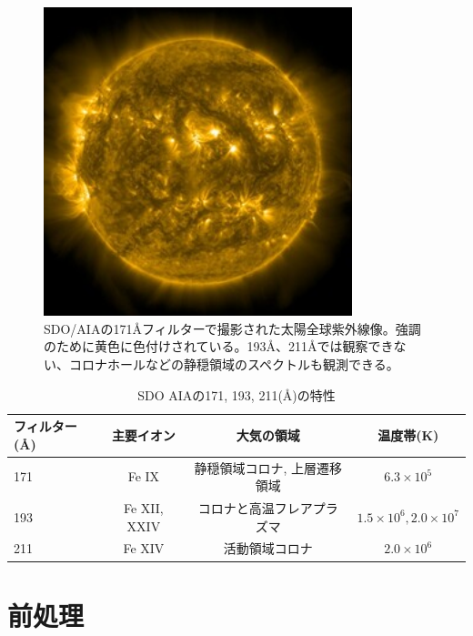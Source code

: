     \begin{figure}[h]
        \centering
        \includegraphics[width=0.8\textwidth]{figures/data/latest_256_0171.jpg}
        \caption{SDO/AIAの171Åフィルターで撮影された太陽全球紫外線像。強調のために黄色に色付けされている。193Å、211Åでは観察できない、コロナホールなどの静穏領域のスペクトルも観測できる。}
        \label{fig:sample_aia171}
    \end{figure}

\begin{table}[hptb]
    \centering
    \caption{SDO AIAの171, 193, 211(\AA)の特性}
    \begin{tabular}{lccc}
    \hline
    \textbf{フィルター (\AA)} & \textbf{主要イオン} & \textbf{大気の領域} & \textbf{温度帯(K)}  \\ \hline
    171 & Fe IX & 静穏領域コロナ, 上層遷移領域 & \(6.3 \times 10^{5} \) \\ \hline
    193 & Fe XII, XXIV & コロナと高温フレアプラズマ & \(1.5 \times 10^6, 2.0 \times 10^7 \)  \\ \hline
    211 & Fe XIV & 活動領域コロナ & \(2.0 \times 10^6\) \\ \hline
    \end{tabular}
    \label{table:aia_filters_details}
\end{table}


\section{前処理}

